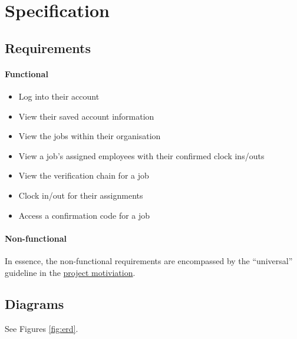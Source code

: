 \section{Specification}

\subsection{Requirements} \label{ss:requirements}

\paragraph{Functional}

\begin{itemize}
  \item Log into their account
  \item View their saved account information
  \item View the jobs within their organisation
  \item View a job's assigned employees with their
        confirmed clock ins/outs
  \item View the verification chain for a job
  \item Clock in/out for their assignments
  \item Access a confirmation code for a job
\end{itemize}

\paragraph{Non-functional}

In essence, the non-functional requirements are encompassed
by the \enquote{universal} guideline in the
\hyperref[s:motivation]{project motiviation}.

\subsection{Diagrams}

See Figures \ref{fig:erd}.


